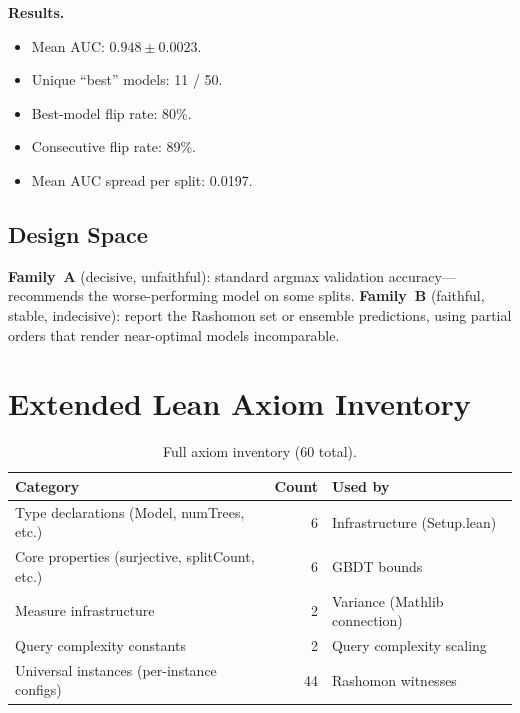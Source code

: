 \documentclass{article}
\begin{document}
\textbf{Results.}
\begin{itemize}
  \item Mean AUC: $0.948 \pm 0.0023$.
  \item Unique ``best'' models: 11 / 50.
  \item Best-model flip rate: 80\%.
  \item Consecutive flip rate: 89\%.
  \item Mean AUC spread per split: 0.0197.
\end{itemize}

\subsection{Design Space}

\textbf{Family~A} (decisive, unfaithful): standard argmax validation accuracy---recommends the worse-performing model on some splits.
\textbf{Family~B} (faithful, stable, indecisive): report the Rashomon set or ensemble predictions, using partial orders that render near-optimal models incomparable.

\section{Extended Lean Axiom Inventory}
\label{sec:axiom-inventory}

\begin{table}[h]
\centering
\caption{Full axiom inventory (60 total).}
\small
\begin{tabular}{lrl}
\toprule
Category & Count & Used by \\
\midrule
Type declarations (Model, numTrees, etc.) & 6 & Infrastructure (Setup.lean) \\
Core properties (surjective, splitCount, etc.) & 6 & GBDT bounds \\
Measure infrastructure & 2 & Variance (Mathlib connection) \\
Query complexity constants & 2 & Query complexity scaling \\
Universal instances (per-instance configs) & 44 & Rashomon witnesses \\
\bottomrule
\end{tabular}
\end{table}
\end{document}

